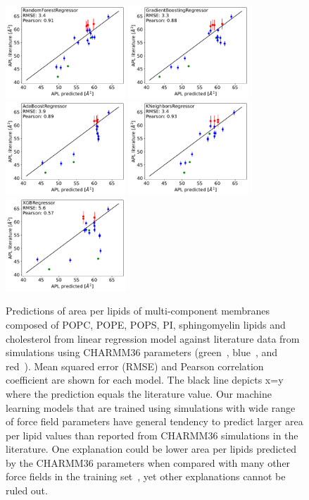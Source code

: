 \documentclass[fleqn,10pt]{wlscirepSI}
\begin{document}
\begin{figure}[hb]
    \includegraphics[width=45mm]{Figures/MLtest/RandomForestRegressortest.pdf}
    \includegraphics[width=45mm]{Figures/MLtest/GradientBoostingRegressortest.pdf}
    \includegraphics[width=45mm]{Figures/MLtest/AdaBoostRegressortest.pdf}
    \includegraphics[width=45mm]{Figures/MLtest/KNeighborsRegressortest.pdf}
    \includegraphics[width=45mm]{Figures/MLtest/XGBRegressortest.pdf}
    \caption{Predictions of area per lipids of multi-component membranes composed of POPC, POPE, POPS, PI, sphingomyelin lipids and cholesterol from linear regression model against literature data from simulations using CHARMM36 parameters (green~\cite{shahane19}, blue~\cite{kumar21}, and red~\cite{oliveira22}). Mean squared error (RMSE) and Pearson correlation coefficient are shown for each model. The black line depicts x=y where the prediction equals the literature value. Our machine learning models that are trained using simulations with wide range of force field parameters  have general tendency to predict larger area per lipid values than reported from CHARMM36 simulations in the literature. One explanation could be lower area per lipids predicted by the CHARMM36 parameters when compared with many other force fields in the training set~\cite{javanainen23}, yet other explanations cannot be ruled out.}
    \label{fig:MLTest}
\end{figure}
\end{document}
